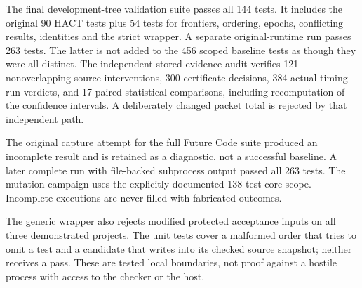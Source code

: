 The final development-tree validation suite passes all 144 tests. It includes the original 90 HACT tests plus 54 tests for frontiers, ordering, epochs, conflicting results, identities and the strict wrapper. A separate original-runtime run passes 263 tests. The latter is not added to the 456 scoped baseline tests as though they were all distinct. The independent stored-evidence audit verifies 121 nonoverlapping source interventions, 300 certificate decisions, 384 actual timing-run verdicts, and 17 paired statistical comparisons, including recomputation of the confidence intervals. A deliberately changed packet total is rejected by that independent path.

The original capture attempt for the full Future Code suite produced an incomplete result and is retained as a diagnostic, not a successful baseline. A later complete run with file-backed subprocess output passed all 263 tests. The mutation campaign uses the explicitly documented 138-test core scope. Incomplete executions are never filled with fabricated outcomes.

The generic wrapper also rejects modified protected acceptance inputs on all three demonstrated projects. The unit tests cover a malformed order that tries to omit a test and a candidate that writes into its checked source snapshot; neither receives a pass. These are tested local boundaries, not proof against a hostile process with access to the checker or the host.
